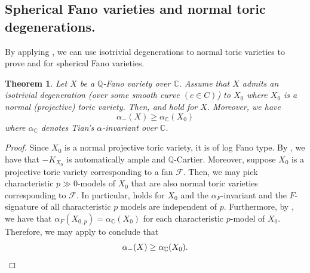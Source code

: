 \documentclass[11pt,reqno]{amsart}
\newcommand{\C}{\mathbb{C}}
\newcommand{\Q}{\mathbb{Q}}
\newcommand{\cF}{\mathcal{F}}
\newcommand{\cL}{\mathcal{L}}
\newcommand{\cX}{\mathcal{X}}
\newcommand{\fm}{\mathfrak{m}}
\newcommand{\isom}{\cong}
\numberwithin{equation}{section}
\newtheorem{thm}[prop] {Theorem}
\theoremstyle{definition}
\newcommand{\FA}{\alpha_{F}}
\begin{document}


\subsection{Spherical Fano varieties and normal toric degenerations.}

By applying , we can use isotrivial degenerations to normal toric varieties to prove  and  for spherical Fano varieties.

\begin{thm} \label{normaltoricdegeneration}
      Let $X$ be a $\Q$-Fano variety over $\C$. Assume that $X$ admits an isotrivial degeneration (over some smooth curve $(c \in C)$) to $X_0$ where $X_0$ is a normal (projective) toric variety. Then,  and  hold for $X$. Moreover, we have
    \[ \alpha_{-} (X) \geq \alpha_\C (X_0) \]
    where $\alpha_\C$ denotes Tian's $\alpha$-invariant over $\C$.
\end{thm}
\begin{proof}
    Since $X_0$ is a normal projective toric variety, it is of log Fano type. By , we have that $-K_{X_0}$ is automatically ample and $\Q$-Cartier. Moreover, suppose $X_0$ is a projective toric variety corresponding to a fan $\cF$. Then, we may pick characteristic $p \gg 0$-models of $X_0$ that are also normal toric varieties corresponding to $\cF$. In particular,  holds for $X_0$ and the $\FA$-invariant and the $F$-signature of all characteristic $p$ models are independent of $p$. Furthermore, by \cite[Theorem~4.12]{PandeFrobeniusAlpha}, we have that $\FA(X_{0,p}) = \alpha_\C (X_0)$ for each characteristic $p$-model of $X_0$.
    Therefore, we may apply  to conclude that \[ \alpha_{-} (X) \geq \alpha_{\C} (X_0) . \qedhere \]
\end{proof}
\end{document}

